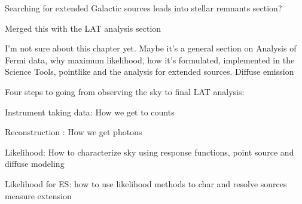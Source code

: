 Searching for extended Galactic sources leads into stellar remnants section?

Merged this with the LAT analysis  section

I'm not sure about this chapter yet. Maybe it's a general section on Analysis of Fermi data, why maximum likelihood, how it's formulated,  implemented in the Science Tools, pointlike and the analysis for extended sources. Diffuse emission

Four steps to going from observing the sky to final LAT analysis:

Instrument taking data: How we get to counts

Reconstruction : How we get photons

Likelihood: How to characterize sky using response functions, point source  and diffuse modeling

Likelihood for ES: how to use likelihood methods to char and resolve sources measure  extension


